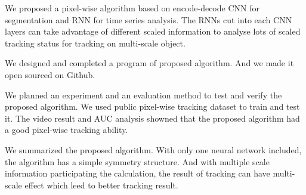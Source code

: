 \begin{eabstract}
	\par
	We proposed a pixel-wise algorithm based on encode-decode CNN for segmentation and RNN for time series analysis. The RNNs cut into each CNN layers can take advantage of different scaled information to analyse lots of scaled tracking status for tracking on multi-scale object.
	\par
	We designed and completed a program of proposed algorithm. And we made it open sourced on Github.
	\par
	We planned an experiment and an evaluation method to test and verify the proposed algorithm. We used public pixel-wise tracking dataset to train and test it. The video result and AUC analysis showned that the proposed algorithm had a good pixel-wise tracking ability.
	\par
	We summarized the proposed algorithm. With only one neural network included, the algorithm has a simple symmetry structure. And with multiple scale information participating the calculation, the result of tracking can have multi-scale effect which leed to better tracking result.
\end{eabstract}

